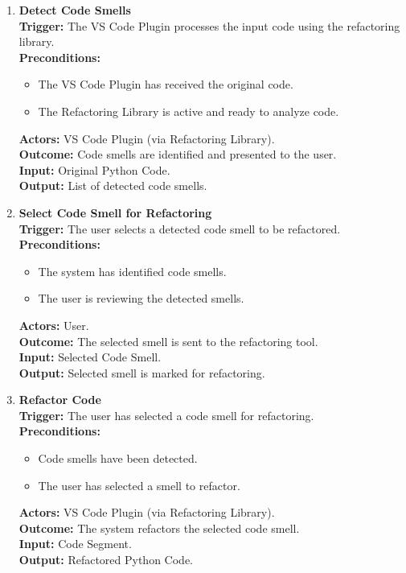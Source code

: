 \documentclass[12pt]{article}
\begin{document}
\setlength{\parindent}{0pt}
\begin{enumerate}[label={\bf PUC \arabic*:}, wide=0pt, font=\itshape]

  \item \textbf{Detect Code Smells} \\[2mm]
    \textbf{Trigger:} The VS Code Plugin processes the input code
    using the refactoring library. \\[2mm]
    \textbf{Preconditions:}
    \begin{itemize}
      \item The VS Code Plugin has received the original code.
      \item The Refactoring Library is active and ready to analyze code.
    \end{itemize}
    \textbf{Actors:} VS Code Plugin (via Refactoring Library). \\
    \textbf{Outcome:} Code smells are identified and presented to the user. \\
    \textbf{Input:} Original Python Code. \\
    \textbf{Output:} List of detected code smells.

  \item \textbf{Select Code Smell for Refactoring} \\[2mm]
    \textbf{Trigger:} The user selects a detected code smell to be
    refactored. \\[2mm]
    \textbf{Preconditions:}
    \begin{itemize}
      \item The system has identified code smells.
      \item The user is reviewing the detected smells.
    \end{itemize}
    \textbf{Actors:} User. \\
    \textbf{Outcome:} The selected smell is sent to the refactoring tool. \\
    \textbf{Input:} Selected Code Smell. \\
    \textbf{Output:} Selected smell is marked for refactoring.

  \item \textbf{Refactor Code} \\[2mm]
    \textbf{Trigger:} The user has selected a code smell for
    refactoring. \\[2mm]
    \textbf{Preconditions:}
    \begin{itemize}
      \item Code smells have been detected.
      \item The user has selected a smell to refactor.
    \end{itemize}
    \textbf{Actors:} VS Code Plugin (via Refactoring Library). \\
    \textbf{Outcome:} The system refactors the selected code smell. \\
    \textbf{Input:} Code Segment. \\
    \textbf{Output:} Refactored Python Code.


\end{enumerate}
\end{document}
